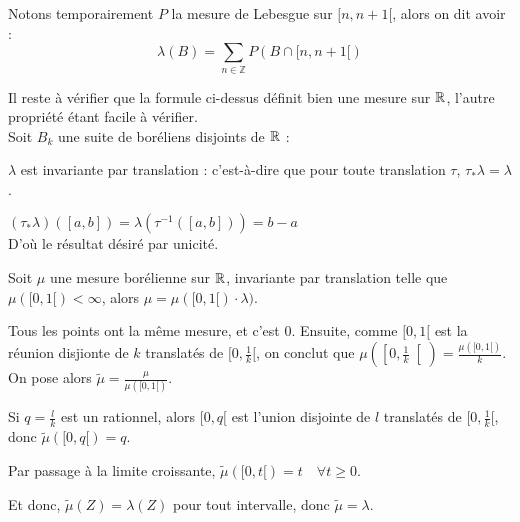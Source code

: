 \documentclass[10pt,a4paper,notitlepage ]{report}
\begin{document}
Notons temporairement $P$ la mesure de Lebesgue sur $[n , n+1 [ $, alors on dit avoir :
\begin{equation*}
\lambda (B) = \sum \limits_{n \in \mathbb{Z} }P (B \cap [n, n+1[ )
\end{equation*}


Il reste à vérifier que la formule ci-dessus définit bien une mesure sur $\mathbb R$, l'autre propriété étant facile à vérifier. \\

Soit $B_k $ une suite de boréliens disjoints de $\mathbb R$ : 

\begin{propriete}

$\lambda$ est invariante par translation : c'est-à-dire que pour toute translation $\tau$, $\tau _* \lambda = \lambda $. 

\end{propriete}

\begin{demo}

$\left( \tau _* \lambda \right) \left( [a,b] \right)  = \lambda \left( \tau^{-1}  \left( [a,b] \right) \right) = b-a $ \\

D'où le résultat désiré par unicité.

\end{demo}

\begin{propriete}

Soit $\mu $ une mesure borélienne sur $\mathbb R$, invariante par translation telle que $\mu ([0,1[ )< \infty $, alors $\mu = \mu ([0,1[ ) \cdot \lambda )$.

\end{propriete}

\begin{demo}
	Tous les points ont la même mesure, et c'est $0$. Ensuite, comme $[0,1[$ est la réunion disjionte de $k$ translatés de $[0,\frac 1 k[$, on conclut que $\mu\left(\left[0, \frac 1 k\right[\right) = \frac{\mu([0,1[)}{k}$. On pose alors $\tilde \mu = \frac \mu {\mu([0,1[)}$.
	
	Si $q=\frac l k$ est un rationnel, alors $[0,q[$ est l'union disjointe de $l$ translatés de $[0,\frac 1 k[$, donc $\tilde\mu([0,q[)= q$.
	
	Par passage à la limite croissante, $\tilde\mu([0,t[) = t \quad \forall t \ge 0$.
	
	Et donc, $\tilde\mu(Z)=\lambda(Z)$ pour tout intervalle, donc $\tilde\mu=\lambda$.
\end{demo}
\end{document}
